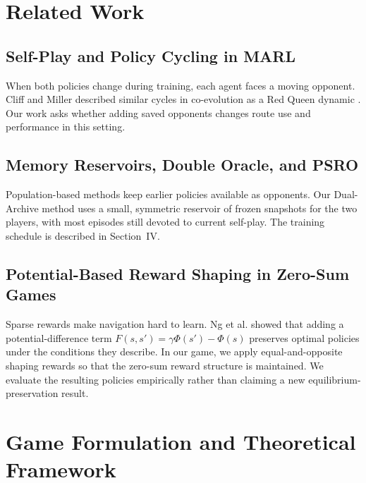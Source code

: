 \documentclass[conference]{IEEEtran}
\begin{document}
\section{Related Work}

\subsection{Self-Play and Policy Cycling in MARL}
When both policies change during training, each agent faces a moving opponent. Cliff and Miller described similar cycles in co-evolution as a Red Queen dynamic \cite{cliff1995tracking}. Our work asks whether adding saved opponents changes route use and performance in this setting.

\subsection{Memory Reservoirs, Double Oracle, and PSRO}
Population-based methods keep earlier policies available as opponents. Our Dual-Archive method uses a small, symmetric reservoir of frozen snapshots for the two players, with most episodes still devoted to current self-play. The training schedule is described in Section~IV.

\subsection{Potential-Based Reward Shaping in Zero-Sum Games}
Sparse rewards make navigation hard to learn. Ng et al. \cite{ng1999policy} showed that adding a potential-difference term $F(s, s') = \gamma \Phi(s') - \Phi(s)$ preserves optimal policies under the conditions they describe. In our game, we apply equal-and-opposite shaping rewards so that the zero-sum reward structure is maintained. We evaluate the resulting policies empirically rather than claiming a new equilibrium-preservation result.

\section{Game Formulation and Theoretical Framework}
\end{document}
